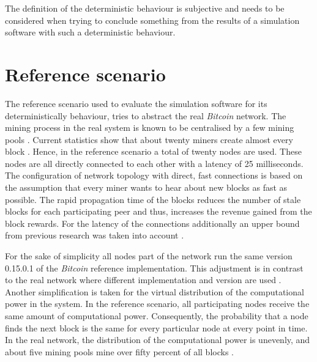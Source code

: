 The definition of the deterministic behaviour is subjective and needs to be considered when trying to conclude something from the results of a simulation software with such a deterministic behaviour.

\section{Reference scenario}
\label{chap:reference_scenario}

The reference scenario used to evaluate the simulation software for its deterministically behaviour, tries to abstract the real \textit{Bitcoin} network.
The mining process in the real system is known to be centralised by a few mining pools \cite{gervais2014bitcoin, beikverdi2015trend, tschorsch2016bitcoin, clarkresearch}.
Current statistics show that about twenty miners create almost every block \cite{blockchaininfopools, coindanceblocks, bitcointickerpools}.
Hence, in the reference scenario a total of twenty nodes are used.
These nodes are all directly connected to each other with a latency of 25 milliseconds.
The configuration of network topology with direct, fast connections is based on the assumption that every miner wants to hear about new blocks as fast as possible.
The rapid propagation time of the blocks reduces the number of stale blocks for each participating peer and thus, increases the revenue gained from the block rewards.
For the latency of the connections additionally an upper bound from previous research was taken into account \cite{decker2013information}.

For the sake of simplicity all nodes part of the network run the same version 0.15.0.1 \cite{bitcoin15} of the \textit{Bitcoin} reference implementation.
This adjustment is in contrast to the real network where different implementation and version are used \cite{coindancenodes}.
Another simplification is taken for the virtual distribution of the computational power in the system.
In the reference scenario, all participating nodes  receive the same amount of computational power.
Consequently, the probability that a node finds the next block is the same for every particular node at every point in time.
In the real network, the distribution of the computational power is unevenly, and about five mining pools mine over fifty percent of all blocks \cite{gervais2014bitcoin, blockchaininfopools, coindanceblocks, bitcointickerpools}. 

